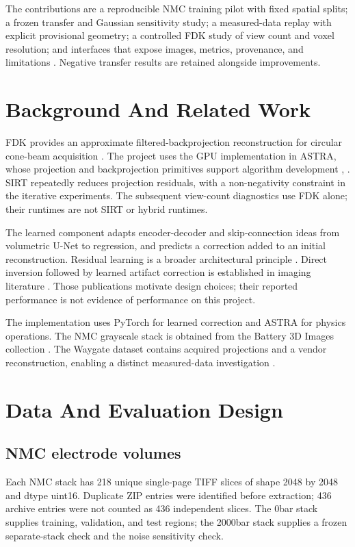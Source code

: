 \documentclass[conference,a4paper]{IEEEtran}
\begin{document}
The contributions are a reproducible NMC training pilot with fixed spatial splits; a frozen transfer and Gaussian sensitivity study; a measured-data replay with explicit provisional geometry; a controlled FDK study of view count and voxel resolution; and interfaces that expose images, metrics, provenance, and limitations \cite{ref10}. Negative transfer results are retained alongside improvements.

\section{Background And Related Work}

FDK provides an approximate filtered-backprojection reconstruction for circular cone-beam acquisition \cite{ref1}. The project uses the GPU implementation in ASTRA, whose projection and backprojection primitives support algorithm development \cite{ref2}, \cite{ref3}. SIRT repeatedly reduces projection residuals, with a non-negativity constraint in the iterative experiments. The subsequent view-count diagnostics use FDK alone; their runtimes are not SIRT or hybrid runtimes.

The learned component adapts encoder-decoder and skip-connection ideas from volumetric U-Net \cite{ref4} to regression, and predicts a correction added to an initial reconstruction. Residual learning is a broader architectural principle \cite{ref5}. Direct inversion followed by learned artifact correction is established in imaging literature \cite{ref6}. Those publications motivate design choices; their reported performance is not evidence of performance on this project.

The implementation uses PyTorch for learned correction \cite{ref7} and ASTRA for physics operations. The NMC grayscale stack is obtained from the Battery 3D Images collection \cite{ref8}. The Waygate dataset contains acquired projections and a vendor reconstruction, enabling a distinct measured-data investigation \cite{ref9}.

\section{Data And Evaluation Design}

\subsection{NMC electrode volumes}

Each NMC stack has 218 unique single-page TIFF slices of shape 2048 by 2048 and dtype uint16. Duplicate ZIP entries were identified before extraction; 436 archive entries were not counted as 436 independent slices. The 0bar stack supplies training, validation, and test regions; the 2000bar stack supplies a frozen separate-stack check and the noise sensitivity check.
\end{document}
